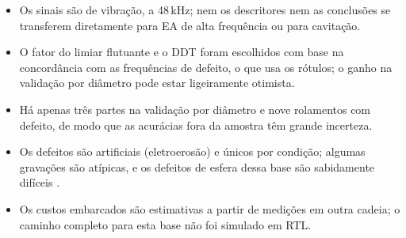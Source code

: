 \begin{itemize}
	\item Os sinais são de vibração, a 48\,kHz; nem os descritores nem as conclusões se transferem diretamente para EA de alta frequência ou para cavitação.
	\item O fator do limiar flutuante e o DDT foram escolhidos com base na concordância com as frequências de defeito, o que usa os rótulos; o ganho na validação por diâmetro pode estar ligeiramente otimista.
	\item Há apenas três partes na validação por diâmetro e nove rolamentos com defeito, de modo que as acurácias fora da amostra têm grande incerteza.
	\item Os defeitos são artificiais (eletroerosão) e únicos por condição; algumas gravações são atípicas, e os defeitos de esfera dessa base são sabidamente difíceis \cite{smith2015}.
	\item Os custos embarcados são estimativas a partir de medições em outra cadeia; o caminho completo para esta base não foi simulado em RTL.
\end{itemize}

